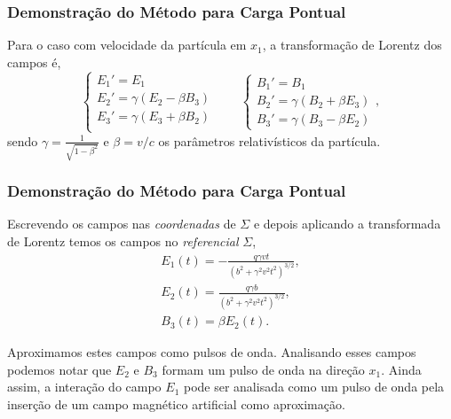 \documentclass[xcolor=dvipsnames]{beamer}
\begin{document}
\begin{frame}
	\frametitle{Demonstração do Método para Carga Pontual}
	Para o caso com velocidade da partícula em $x_1$, a transformação de
	Lorentz dos campos é,
	\begin{equation}
		\label{eq_field_trans}
		\begin{cases}
		E_1' = E_1 \\
		E_2' = \gamma (E_2 - \beta B_3) \\
		E_3' = \gamma (E_3 + \beta B_2) \\
		\end{cases} \qquad
		\begin{cases}
		B_1 ' = B_1 \\
		B_2 ' = \gamma (B_2 + \beta E_3) \\
		B_3' = \gamma(B_3 - \beta E_2)
		\end{cases},
	\end{equation}
	sendo $\displaystyle \gamma = \frac{1}{\sqrt{1-\beta ^2}}$ e $\beta = v/c$
	os parâmetros relativísticos da partícula.
\end{frame}

\begin{frame}
	\frametitle{Demonstração do Método para Carga Pontual}
	Escrevendo os campos nas \textit{coordenadas} de $\Sigma$ e depois
	aplicando a transformada de Lorentz temos os campos no \textit{referencial}
	$\Sigma$,
	\begin{gather}
		E_1 (t) = -\frac{q\gamma vt}{(b^2 + \gamma ^2 v^2t^2)^{3/2}}
			\label{eq_field1},\\
		E_2 (t) = \frac{q\gamma b}{(b^2 + \gamma ^2 v^2 t
			^2)^{3/2}}\label{eq_field2},\\ 
		B_3 (t) = \beta E_2(t) \label{eq_field3}.
	\end{gather}
	\begin{block}{Aproximamos estes campos como pulsos de onda.}
		Analisando esses campos podemos notar que $E_2$ e $B_3$ formam um pulso
		de onda na direção $x_1$. Ainda assim, a interação do campo $E_1$ pode
		ser analisada como um pulso de onda pela inserção de um campo magnético
		artificial como aproximação.
	\end{block}
\end{frame}
\end{document}

